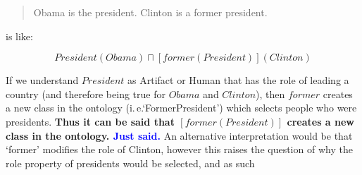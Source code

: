 \documentclass[11pt]{article}
\begin{document}
\begin{quote}
Obama is the president. Clinton is a former president.
\end{quote}

is like:

\[
President(Obama) \sqcap [former(President)](Clinton)
\]

If we understand $President$ as Artifact or Human that has the role of leading a country
(and therefore being true for $Obama$ and $Clinton$), then $former$ creates a new class in the ontology (i.\,e.`FormerPresident') which selects
people who were presidents. \textbf{Thus it
can be said that $[former(President)]$ creates a new class in the ontology. \textcolor{blue}{Just said.}} An alternative
    interpretation would be that `former' modifies the role of Clinton, however this raises the
    question of why the role property of presidents would be selected, and as such
\end{document}
